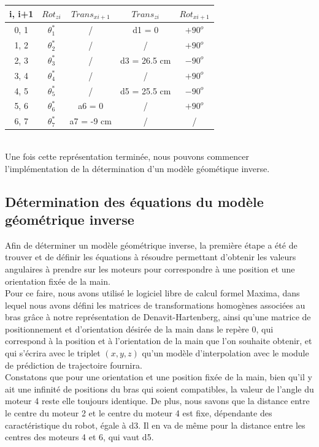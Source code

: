 \begin{tabular}{|c|c|c|c|c|}
\hline
i, i+1 & $Rot_{zi}$ & $Trans_{xi+1}$ & $Trans_{zi}$ & $Rot_{xi+1}$\\
\hline   
0, 1 & $\theta_1^*$ & / & d1 = 0 & $+90^o$        \\
1, 2 & $\theta_2^*$ & / & / & $+90^o$\\
2, 3 & $\theta_3^*$ & / & d3 = 26.5 cm & $-90^o$\\
3, 4 & $\theta_4^*$ & / & / & $+90^o$\\
4, 5 & $\theta_5^*$ & / & d5 = 25.5 cm& $-90^o$\\
5, 6 & $\theta_6^*$ & a6 = 0 & / & $+90^o$\\
6, 7 & $\theta_7^*$ & a7 = -9 cm & / & / \\
\hline
\end{tabular}
\\

Une fois cette représentation terminée, nous pouvons commencer l'implémentation de la détermination d'un modèle géométique inverse.

\subsection{Détermination des équations du modèle géométrique inverse}

Afin de déterminer un modèle géométrique inverse, la première étape a été de trouver et de définir les équations à résoudre permettant d'obtenir les valeurs angulaires à prendre sur les moteurs pour correspondre à une position et une orientation fixée de la main.\\

Pour ce faire, nous avons utilisé le logiciel libre de calcul formel Maxima, dans lequel nous avons défini les matrices de transformations homogènes associées au bras grâce à notre représentation de Denavit-Hartenberg, ainsi qu'une matrice de positionnement et d'orientation désirée de la main dans le repère 0, qui correspond à la position et à l'orientation de la main que l'on souhaite obtenir, et qui s'écrira avec le triplet $(x, y, z)$ qu'un modèle d'interpolation avec le module de prédiction de trajectoire fournira.\\

Constatons que pour une orientation et une position fixée de la main, bien qu'il y ait une infinité de positions du bras qui soient compatibles, la valeur de l'angle du moteur 4 reste elle toujours identique. De plus, nous savons que la distance entre le centre du moteur 2 et le centre du moteur 4 est fixe, dépendante des caractéristique du robot, égale à d3. Il en va de même pour la distance entre les centres des moteurs 4 et 6, qui vaut d5.\\


